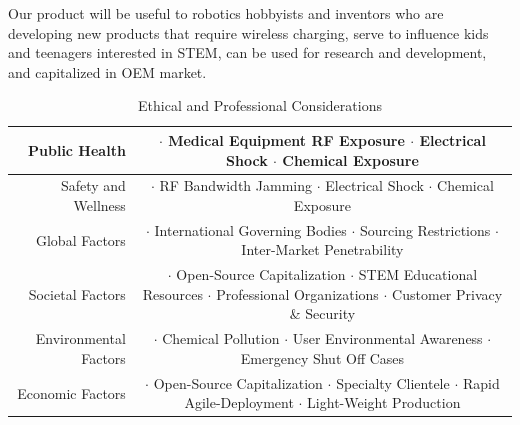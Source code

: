 \documentclass[12pt]{article}
\begin{document}
\indent
Our product will be useful to robotics hobbyists and inventors who are developing new products that require wireless charging, serve to influence kids and teenagers interested in STEM, can be used for research and development, and capitalized in OEM market.

\begin{table}[h!]
\centering
\caption*{Ethical and Professional Considerations}
\begin{tabular} {| r | c | }
\hline
\parbox{0.3\linewidth}{\raggedleft Public Health} &   \parbox{0.65\linewidth}{\hfill \\
$\cdot$ Medical Equipment RF Exposure \\ $\cdot$ Electrical Shock \\ $\cdot$ Chemical Exposure}\\
\hline
\parbox{0.3\linewidth}{\raggedleft Safety and Wellness} &   \parbox{0.65\linewidth}{\hfill \\
$\cdot$ RF Bandwidth Jamming \\ $\cdot$ Electrical Shock \\ $\cdot$ Chemical Exposure}\\
\hline
\parbox{0.3\linewidth}{\raggedleft Global Factors} &   \parbox{0.65\linewidth}{\hfill \\
$\cdot$ International Governing Bodies \\ $\cdot$ Sourcing Restrictions \\ $\cdot$ Inter-Market Penetrability}\\
\hline
\parbox{0.3\linewidth}{\raggedleft Societal Factors} &   \parbox{0.65\linewidth}{\hfill \\
$\cdot$ Open-Source Capitalization\\ $\cdot$ STEM Educational Resources \\ $\cdot$ Professional Organizations \\ $\cdot$ Customer Privacy \& Security}\\
\hline
\parbox{0.3\linewidth}{\raggedleft Environmental Factors} &   \parbox{0.65\linewidth}{\hfill \\
$\cdot$ Chemical Pollution\\ $\cdot$ User Environmental Awareness\\ $\cdot$ Emergency Shut Off Cases}\\
\hline
\parbox{0.3\linewidth}{\raggedleft Economic Factors} &   \parbox{0.65\linewidth}{\hfill \\
$\cdot$ Open-Source Capitalization\\ $\cdot$ Specialty Clientele\\ $\cdot$ Rapid Agile-Deployment\\ $\cdot$ Light-Weight Production}\\
\hline
\end{tabular}
\end{table}
\hfill \\
\end{document}
